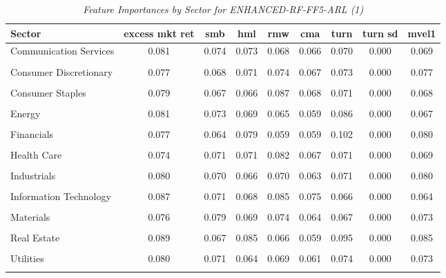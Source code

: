            \begin{table}[ht]
            \centering
            \caption{\textit{Feature Importances by Sector for ENHANCED-RF-FF5-ARL (1)}}
            \label{tab:feature_importance_enhanced-rf-ff5-arl_1}
            \begin{tabular}{lcccccccc}
            \toprule
            Sector & excess mkt ret & smb & hml & rmw & cma & turn & turn sd & mvel1 \\
            \midrule
            Communication Services & 0.081 & 0.074 & 0.073 & 0.068 & 0.066 & 0.070 & 0.000 & 0.069 \\\\
Consumer Discretionary & 0.077 & 0.068 & 0.071 & 0.074 & 0.067 & 0.073 & 0.000 & 0.077 \\\\
Consumer Staples & 0.079 & 0.067 & 0.066 & 0.087 & 0.068 & 0.071 & 0.000 & 0.068 \\\\
Energy & 0.081 & 0.073 & 0.069 & 0.065 & 0.059 & 0.086 & 0.000 & 0.067 \\\\
Financials & 0.077 & 0.064 & 0.079 & 0.059 & 0.059 & 0.102 & 0.000 & 0.080 \\\\
Health Care & 0.074 & 0.071 & 0.071 & 0.082 & 0.067 & 0.071 & 0.000 & 0.069 \\\\
Industrials & 0.080 & 0.070 & 0.066 & 0.070 & 0.063 & 0.071 & 0.000 & 0.080 \\\\
Information Technology & 0.087 & 0.071 & 0.068 & 0.085 & 0.075 & 0.066 & 0.000 & 0.064 \\\\
Materials & 0.076 & 0.079 & 0.069 & 0.074 & 0.064 & 0.067 & 0.000 & 0.073 \\\\
Real Estate & 0.089 & 0.067 & 0.085 & 0.066 & 0.059 & 0.095 & 0.000 & 0.085 \\\\
Utilities & 0.080 & 0.071 & 0.064 & 0.069 & 0.061 & 0.074 & 0.000 & 0.073 \\\\
            \bottomrule
            \end{tabular}%
            \end{table}